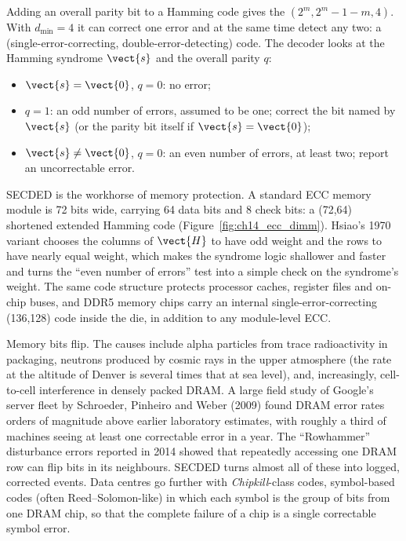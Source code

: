 Adding an overall parity bit to a Hamming code gives the 
$(2^m,2^m-1-m,4)$. With $d_{\min}=4$ it can correct one error and at the same time detect any two:
a  (single-error-correcting, double-error-detecting) code. The decoder looks at the
Hamming syndrome $\vect{s}$ and the overall parity $q$:
\begin{itemize}
\item $\vect{s}=\vect{0}$, $q=0$: no error;
\item $q=1$: an odd number of errors, assumed to be one; correct the bit named by $\vect{s}$ (or the
parity bit itself if $\vect{s}=\vect{0}$);
\item $\vect{s}\ne\vect{0}$, $q=0$: an even number of errors, at least two; report an
uncorrectable error.
\end{itemize}
SECDED is the workhorse of memory protection. A standard ECC memory module is 72 bits wide,
carrying 64 data bits and 8 check bits: a (72,64) shortened extended Hamming code
(Figure~\ref{fig:ch14_ecc_dimm}). Hsiao's 1970 variant chooses the columns of $\vect{H}$ to have odd
weight and the rows to have nearly equal weight, which makes the syndrome logic shallower and faster
and turns the ``even number of errors'' test into a simple check on the syndrome's weight. The same
code structure protects processor caches, register files and on-chip buses, and DDR5 memory chips
carry an internal single-error-correcting (136,128) code inside the die, in addition to any
module-level ECC.


\begin{inpractice}
Memory bits flip. The causes include alpha particles from trace radioactivity in packaging,
neutrons produced by cosmic rays in the upper atmosphere (the rate at the altitude of Denver is
several times that at sea level), and, increasingly, cell-to-cell interference in densely packed
DRAM. A large field study of Google's server fleet by Schroeder, Pinheiro and Weber (2009) found
DRAM error rates orders of magnitude above earlier laboratory estimates, with roughly a third of
machines seeing at least one correctable error in a year. The ``Rowhammer'' disturbance errors
reported in 2014 showed that repeatedly accessing one DRAM row can flip bits in its neighbours.
SECDED turns almost all of these into logged, corrected events. Data centres go further with
\emph{Chipkill}-class codes, symbol-based codes (often Reed--Solomon-like) in which each symbol is
the group of bits from one DRAM chip, so that the complete failure of a chip is a single
correctable symbol error.
\end{inpractice}

